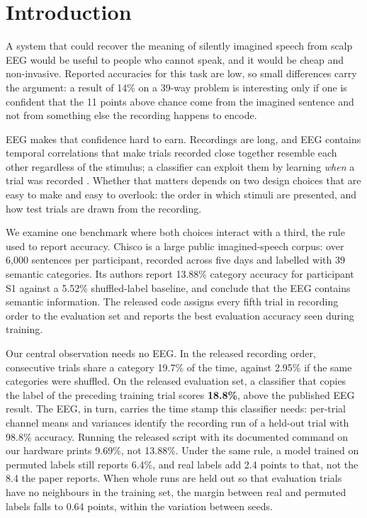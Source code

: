 \section{Introduction}
\label{sec:intro}

A system that could recover the meaning of silently imagined speech from scalp EEG would be useful
to people who cannot speak, and it would be cheap and non-invasive. Reported accuracies for this
task are low, so small differences carry the argument: a result of 14\% on a 39-way problem is
interesting only if one is confident that the 11 points above chance come from the imagined
sentence and not from something else the recording happens to encode.

EEG makes that confidence hard to earn. Recordings are long, and EEG contains temporal
correlations that make trials recorded close together resemble each other regardless of the
stimulus; a classifier can exploit them by learning \emph{when} a trial was recorded
\citep{li2021perils}. Whether that matters depends on
two design choices that are easy to make and easy to overlook: the order in which stimuli are
presented, and how test trials are drawn from the recording.

We examine one benchmark where both choices interact with a third, the rule used to report
accuracy. Chisco \citep{zhang2024chisco} is a large public imagined-speech corpus: over 6{,}000
sentences per participant, recorded across five days and labelled with 39 semantic categories.
Its authors report 13.88\% category accuracy for participant S1 against a 5.52\% shuffled-label
baseline, and conclude that the EEG contains semantic information. The released code assigns every
fifth trial in recording order to the evaluation set and reports the best evaluation accuracy seen
during training.

Our central observation needs no EEG. In the released recording order, consecutive trials share a
category 19.7\% of the time, against 2.95\% if the same categories were shuffled. On the released
evaluation set, a classifier that copies the label of the preceding training trial scores
\textbf{18.8\%}, above the published EEG result. The EEG, in turn, carries the time stamp this
classifier needs: per-trial channel means and variances identify the recording run of a held-out
trial with 98.8\% accuracy. Running the released script with its documented command on our
hardware prints 9.69\%, not 13.88\%. Under the same rule, a model trained on permuted labels still
reports 6.4\%, and real labels add 2.4 points to that, not the 8.4 the paper reports. When whole
runs are held out so that evaluation trials have no neighbours in the training set, the margin
between real and permuted labels falls to 0.64 points, within the variation between seeds.

